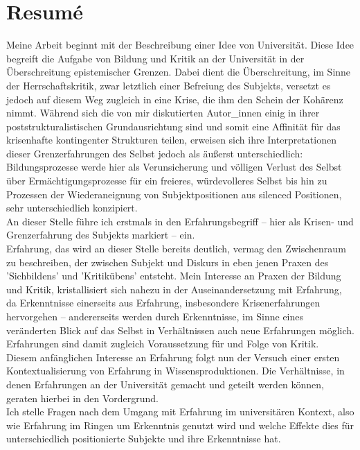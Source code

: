 \section{Resumé}

Meine Arbeit beginnt mit der Beschreibung einer Idee von Universität. Diese Idee
begreift die Aufgabe von Bildung und Kritik an der Universität in der
Überschreitung epistemischer Grenzen. Dabei dient die Überschreitung, im Sinne
der Herrschaftskritik, zwar letztlich einer Befreiung des Subjekts, versetzt es
jedoch auf diesem Weg zugleich in eine Krise, die ihm den Schein der Kohärenz
nimmt. Während sich die von mir diskutierten Autor\_innen einig in ihrer
poststrukturalistischen Grundausrichtung sind und somit eine Affinität für das
krisenhafte kontingenter Strukturen teilen, erweisen sich ihre Interpretationen
dieser Grenzerfahrungen des Selbst jedoch als äußerst unterschiedlich:\\
Bildungsprozesse werde hier als Verunsicherung und völligen Verlust des Selbst
über Ermächtigungsprozesse für ein freieres, würdevolleres Selbst bis hin zu
Prozessen der Wiederaneignung von Subjektpositionen aus silenced Positionen,
sehr unterschiedlich konzipiert.\\
 An dieser Stelle führe ich erstmals in den
Erfahrungsbegriff – hier als Krisen- und Grenzerfahrung des Subjekts markiert –
ein.\\
 Erfahrung, das wird an dieser Stelle bereits deutlich, vermag den
Zwischenraum zu beschreiben, der zwischen Subjekt und Diskurs in eben jenen
Praxen des 'Sichbildens' und 'Kritikübens' entsteht. Mein Interesse an Praxen
der Bildung und Kritik, kristallisiert sich nahezu in der Auseinandersetzung mit
Erfahrung, da Erkenntnisse einerseits aus Erfahrung, insbesondere
Krisenerfahrungen hervorgehen – andererseits werden durch Erkenntnisse, im Sinne
eines veränderten Blick auf das Selbst in Verhältnissen auch neue Erfahrungen
möglich. Erfahrungen sind damit zugleich Voraussetzung für und Folge von Kritik.\\

\noindent Diesem anfänglichen Interesse an Erfahrung folgt nun der Versuch einer ersten
Kontextualisierung von Erfahrung in Wissensproduktionen. Die Verhältnisse, in
denen Erfahrungen an der Universität gemacht und geteilt werden können, geraten
hierbei in den Vordergrund. \\
Ich stelle Fragen nach dem Umgang mit Erfahrung im
universitären Kontext, also wie Erfahrung im Ringen um Erkenntnis genutzt wird
und welche Effekte dies für unterschiedlich positionierte Subjekte und ihre
Erkenntnisse hat.\\

